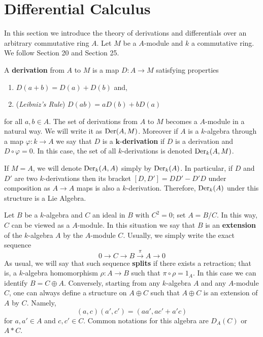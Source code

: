 \section{Differential Calculus}
In this section we introduce the theory of derivations and differentials over an arbitrary commutative ring $A$. Let $M$ be a $A$-module and $k$ a commutative ring. We follow \cite{EGA4} Section 20 and \cite{Matsumura} Section 25. 
\begin{definition}\label{def:derivations-and-differentials}
	A \textbf{derivation} from $A$ to $M$ is a map $D\colon A \to M$ satisfying properties
	\begin{enumerate}[label = (\roman*)]
			\item $D(a + b) = D(a) + D(b)$ and,
			\item (\textit{Leibniz's Rule}) $D(ab) = aD(b) + bD(a)$ 
	\end{enumerate}
for all $a,b \in A$. The set of derivations from $A$ to $M$ becomes a $A$-module in a natural way. We will write it as $\operatorname{Der}(A,M)$. Moreover if $A$ is a $k$-algebra through a map $\varphi\colon k \to A$ we say that $D$ is a $\mathbf{k}$-\textbf{derivation} if $D$ is a derivation and $D \circ \varphi = 0$. In this case, the set of all $k$-derivations is denoted $\operatorname{Der}_{k}(A,M)$.

If $M = A$, we will denote $\operatorname{Der}_{k}(A,A)$ simply by $\operatorname{Der}_{k}(A)$. In particular, if $D$ and $D'$ are two $k$-derivations then its bracket $[D,D'] = DD' - D'D$ under composition as $A \to A$ maps is also a $k$-derivation. Therefore, $\operatorname{Der}_{k}(A)$ under this structure is a Lie Algebra.
\end{definition}
\begin{definition}\label{def:extension-of-algebras}
Let $B$ be a $k$-algebra and $C$ an ideal in $B$ with $C^{2} = 0$; set $A =B/C$. In this way, $C$ can be viewed as a $A$-module. In this situation we say that $B$ is an \textbf{extension} of the $k$-algebra $A$ by the $A$-module $C$. Usually, we simply write the exact sequence
\[\label{eqn:extension}
	0 \to C \to B \xrightarrow{\pi} A \to 0
\]
As usual, we will say that such sequence \textbf{splits} if there exists a retraction; that is, a $k$-algebra homomorphism $\rho\colon A \to B$ such that $\pi \circ \rho = 1_{A}$. In this case we can identify $B = C\oplus A$. Conversely, starting from any $k$-algebra $A$ and any $A$-module $C$, one can always define a structure on $A \oplus C$ such that $A\oplus C$ is an extension of $A$ by $C$. Namely, 
\[
			(a,c)(a',c') = (aa',ac' + a'c)
\]
for $a,a'\in A$ and $c,c' \in C$. Common notations for this algebra are $D_{A}(C)$ or $A * C$.		
\end{definition}
